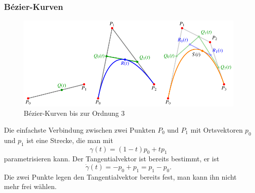 %
%
\subsubsection{Bézier-Kurven}
\begin{figure}
\centering
\includegraphics{chapters/30-interpolation/figures/bezier.pdf}
\caption{Bézier-Kurven bis zur Ordnung 3
\label{buch:interpolation:figure:bezier}}
\end{figure}
Die einfachste Verbindung zwischen zwei Punkten $P_0$ und $P_1$ mit
Ortsvektoren $p_0$ und $p_1$ ist eine Strecke, die man mit
\[
\gamma(t) = (1-t)p_0 + tp_1
\]
parametrisieren kann.
Der Tangentialvektor ist bereits bestimmt, er ist
\[
\dot{\gamma}(t) = -p_0 + p_1 = p_1-p_0.
\]
Die zwei Punkte legen den Tangentialvektor bereits fest, man kann
ihn nicht mehr frei wählen.

